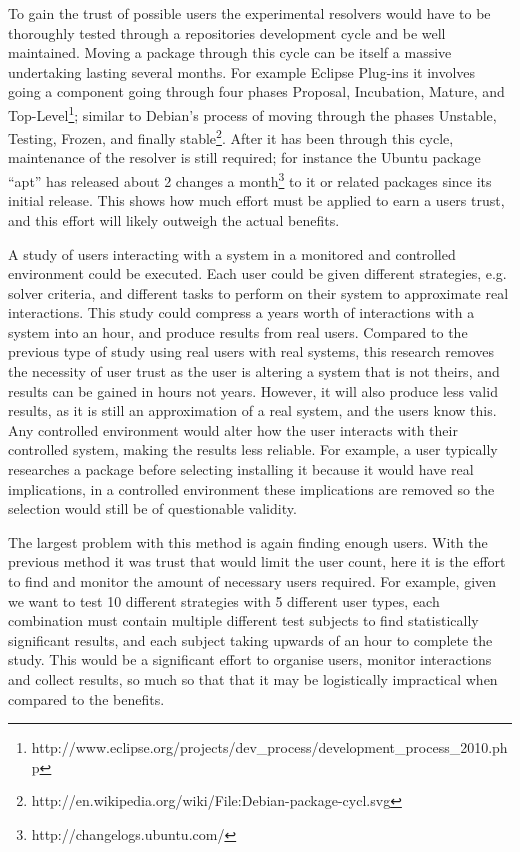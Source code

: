 To gain the trust of possible users the experimental resolvers would have to be thoroughly tested through a repositories development cycle and be well maintained.
Moving a package through this cycle can be itself a massive undertaking lasting several months. 
For example Eclipse Plug-ins it involves going a component going through four phases 
Proposal, Incubation, Mature, and Top-Level\footnote{http://www.eclipse.org/projects/dev\_process/development\_process\_2010.php};
similar to Debian's process of moving through the phases Unstable, Testing, Frozen, and finally stable\footnote{http://en.wikipedia.org/wiki/File:Debian-package-cycl.svg}.
After it has been through this cycle, maintenance of the resolver is still required; 
for instance the Ubuntu package ``apt'' has released about 2 changes a month\footnote{http://changelogs.ubuntu.com/} to it or related packages since its initial release.
This shows how much effort must be applied to earn a users trust, and this effort will likely outweigh the actual benefits.

A study of users interacting with a system in a monitored and controlled environment could be executed.
Each user could be given different strategies, e.g. solver criteria, and different tasks to perform on their system to approximate real interactions.
This study could compress a years worth of interactions with a system into an hour, and produce results from real users. 
Compared to the previous type of study using real users with real systems,
this research removes the necessity of user trust as the user is altering a system that is not theirs,
and results can be gained in hours not years. 
However, it will also produce less valid results, as it is still an approximation of a real system, and the users know this.
Any controlled environment would alter how the user interacts with their controlled system, making the results less reliable.
For example, a user typically researches a package before selecting installing it because it would have real implications, 
in a controlled environment these implications are removed so the selection would still be of questionable validity.

The largest problem with this method is again finding enough users.
With the previous method it was trust that would limit the user count, here it is the effort to find and monitor the amount of necessary users required.
For example, given we want to test 10 different strategies with 5 different user types, each combination must contain multiple different test subjects to find statistically significant results, 
and each subject taking upwards of an hour to complete the study. 
This would be a significant effort to organise users, monitor interactions and collect results, so much so that that it may be logistically impractical when compared to the benefits.

